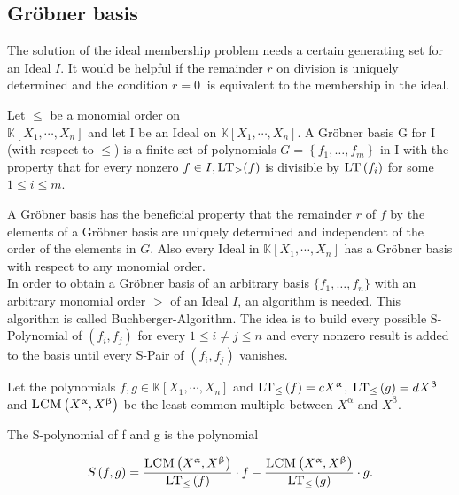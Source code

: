 \subsection{Gröbner basis}
\label{subsec:Groebner}

The solution of the ideal membership problem needs a certain generating set for an Ideal $I$. It would be helpful if the remainder $r$ on division is uniquely determined and the condition $ r = 0~$ is equivalent to the membership in the ideal.



\begin{env_definition}
\cite{KHZ}
Let $\leq$ be a monomial order on \\ $\mathbb{K}\left[X_{1}, \cdots, X_{n}\right]$ and let I be an Ideal on $ \mathbb{K}\left[X_{1}, \cdots, X_{n}\right]  $. A Gröbner basis G for I (with respect to $\leq$) is a finite set of polynomials $ G = \left\lbrace f_{1}, \ldots , f_{m} \right\rbrace $ in I with the property that for every nonzero $ f \in I , \textsc{LT}_{\geq}(f) $ is divisible by $\textsc{LT}\left( f_{i}\right) $ for some $ 1 \leq i \leq m $.

\end{env_definition}

A Gröbner basis has the beneficial property that the remainder $r$ of $f$ by the elements of a Gröbner basis are uniquely determined and independent of the order of the elements in $G$.
Also every Ideal in $\mathbb{K}\left[X_{1}, \cdots, X_{n}\right]$ has a Gröbner basis with respect to any monomial order\cite{KHZ}.\\ 


In order to obtain a Gröbner basis of an arbitrary basis $\{f_{1}, \ldots , f_{n}\}$ with an arbitrary monomial order $>$ of an Ideal $I$, an algorithm is needed. This algorithm is called Buchberger-Algorithm. The idea is to build every possible S-Polynomial of $\left( f_{i},f_{j}\right) $ for every $ 1 \leq i \neq j \leq n $ and every nonzero result is added to the basis until every S-Pair of $\left( f_{i},f_{j}\right) $ vanishes.

Let the polynomials $f,g \in \mathbb{K}\left[X_{1}, \cdots, X_{n}\right] $ and $\textsc{LT}_{\leq}\left(f \right) = cX^{\upalpha} $, $\textsc{LT}_{\leq}\left(g \right) = dX^{\upbeta} $ and $\textsc{LCM}\left( X^{\upalpha},X^{\upbeta}\right) $ be the least common multiple between $X^{\upalpha}$ and $X^{\upbeta}$. 

\begin{env_definition}[S-Polynomial]
\cite{KHZ} The S-polynomial of f and g is the polynomial

\[ S\left( f,g\right) = \frac{\textsc{LCM}\left( X^{\upalpha}, X^{\upbeta}\right) }{\textsc{LT}_{\leq}\left( f\right) } \cdot f - \frac{ \textsc{LCM}\left( X^{\upalpha}, X^{\upbeta}\right) }{\textsc{LT}_{\leq}\left( g\right) } 
\cdot g. \]


\end{env_definition}

